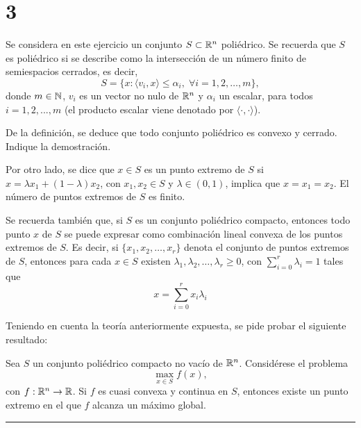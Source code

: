 \section*{3}

Se considera en este ejercicio un conjunto $S \subset \mathbb{R}^n$ poliédrico.
Se recuerda que $S$ es poliédrico si se describe como la intersección de un número finito de semiespacios cerrados,
es decir,
\begin{equation*}
    S = \{ x: \langle v_i, x \rangle \leq \alpha_i, \; \forall i = 1, 2, \dots, m \},
\end{equation*}
donde $m \in \mathbb{N}$, $v_i$ es un vector no nulo de $\mathbb{R}^n$ y $\alpha_i$ un escalar,
para todos $i = 1, 2, . . . , m$ (el producto escalar viene denotado por $\langle \cdot, \cdot \rangle$).

De la definición, se deduce que todo conjunto poliédrico es convexo y cerrado.
Indique la demostración.

Por otro lado, se dice que $x \in S$ es un punto extremo de $S$ si $x = \lambda x_1 + (1 - \lambda)x_2$,
con $x_1 , x_2 \in S$ y $\lambda \in (0, 1)$, implica que $x = x_1 = x_2$.
El número de puntos extremos de $S$ es finito.

Se recuerda también que, si $S$ es un conjunto poliédrico compacto,
entonces todo punto $x$ de $S$ se puede expresar como combinación lineal convexa de los puntos extremos de $S$.
Es decir, si $\{ x_1, x_2, \dots, x_r \}$ denota el conjunto de puntos extremos de $S$,
entonces para cada $x \in S$ existen $\lambda_1, \lambda_2, \dots, \lambda_r \geq 0$,
con $\sum_{i = 0}^{r} \lambda_i = 1$ tales que
\begin{equation*}
    x = \sum_{i = 0}^{r} x_i \lambda_i
\end{equation*}

Teniendo en cuenta la teoría anteriormente expuesta, se pide probar el siguiente resultado:
\begin{theorem}\label{ex3_theorem}
    Sea $S$ un conjunto poliédrico compacto no vacío de $\mathbb{R}^n$.
    Considérese el problema
    \begin{equation}\label{ex3_theorem_opt_problem}
        \max_{x \in S} f(x),
    \end{equation}
    con $f: \mathbb{R}^n \rightarrow \mathbb{R}$.
    Si $f$ es cuasi convexa y continua en $S$,
    entonces existe un punto extremo en el que $f$ alcanza un máximo global.
\end{theorem}

\noindent\rule{10cm}{0.4pt}

